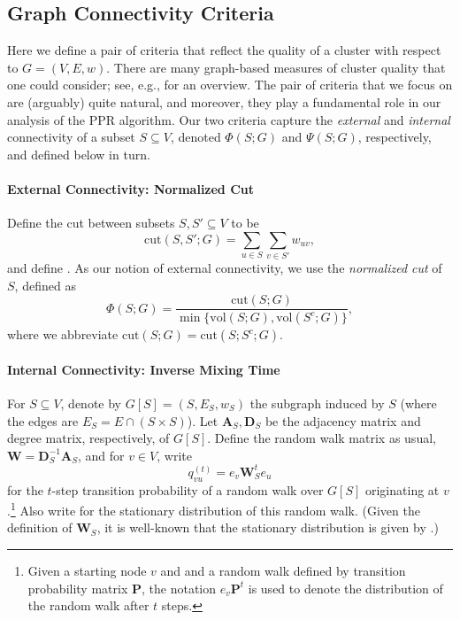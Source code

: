 \documentclass{article}
\newcommand{\vol}{\mathrm{vol}}
\newcommand{\cut}{\mathrm{cut}}
\newcommand{\1}{\mathbf{1}}
\newcommand{\pibf}{\bm{\pi}}
\newcommand{\Abf}{\mathbf{A}}
\newcommand{\Wbf}{\mathbf{W}}
\newcommand{\Dbf}{\mathbf{D}}
\theoremstyle{aldenthm}
\theoremstyle{aldenrmrk}
\begin{document}
\subsection{Graph Connectivity Criteria}

Here we define a pair of criteria that reflect the quality of a cluster with
respect to $G=(V,E,w)$.  There are many graph-based measures of cluster quality  
that one could consider; see, e.g., \citep{yang2015,fortunato2010} for 
an overview.  The pair of criteria that we focus on are (arguably) quite
natural, and moreover, they play a fundamental role in our analysis 
of the PPR algorithm.  Our two criteria capture the \emph{external} and
\emph{internal} connectivity of a subset $S \subseteq V$, denoted $\Phi(S; G)$
and $\Psi(S; G)$, respectively, and defined below in turn.  

\paragraph{External Connectivity: Normalized Cut}

Define the cut between subsets $S,S' \subseteq V$ to be
$$
\cut(S, S'; G) = \sum_{u \in S} \sum_{v \in S'} w_{uv},
$$
and define
\smash{$\vol(S; G) = \cut(S, V; G) = \sum_{u \in S} \sum_{v \in V} w_{uv}$}.  
As our notion of external connectivity, we use the \emph{normalized cut}  
of $S$, defined as 
\begin{equation}
\label{eqn: norm_cut}
\Phi(S; G) = \frac{\cut(S; G)}{\min\{\vol(S; G), \vol(S^c; G)\}},
\end{equation} 
where we abbreviate $\cut(S; G) = \cut(S; S^c; G)$.

\paragraph{Internal Connectivity: Inverse Mixing Time}

For $S \subseteq V$, denote by $G[S] = (S, E_S, w_S)$ the subgraph induced by 
$S$ (where the edges are $E_S = E \cap (S \times S)$). Let $\Abf_S,\Dbf_S$
be the adjacency matrix and degree matrix, respectively, of $G[S]$.  Define the
random walk matrix as usual, $\Wbf = \Dbf_S^{-1} \Abf_S$, and for $v \in V$,
write 
$$
q_{vu}^{(t)} = e_v\Wbf_S^t e_u
$$
for the $t$-step transition probability of a random walk over $G[S]$
originating at $v$.\footnote{Given a starting node $v$ and and a random walk
  defined by transition probability matrix $\mathbf{P}$, the notation $e_v
  \mathbf{P}^t$ is used to denote the distribution of the random walk after $t$
  steps.}   Also write \smash{$\widetilde\pibf = (\widetilde\pi_{u})_{u \in S}$}
for the stationary distribution of this random walk.  (Given the definition of 
$\Wbf_S$, it is well-known that the stationary distribution is given by
\smash{$\widetilde\pi_{u} = (\Dbf_{S})_{uu} / \vol(S; G[S])$}.) 
\end{document}
